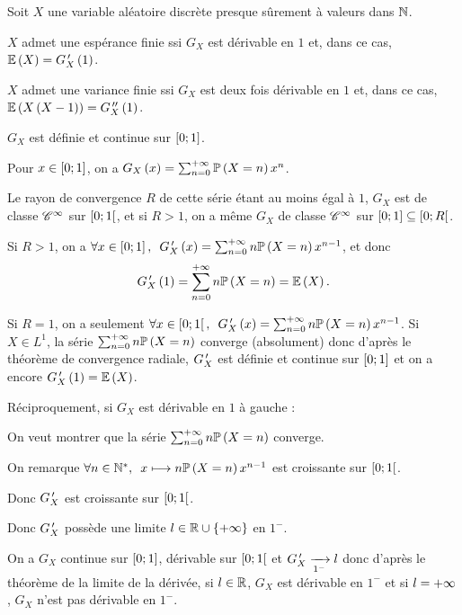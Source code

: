 \begin{theo}
Soit \(X\) une variable aléatoire discrète presque sûrement à valeurs dans \(\mathbb{N}\).

\(X\) admet une espérance finie ssi \(G_X\) est dérivable en \(1\) et, dans ce cas, \(\operatorname{\mathbb{E}}\left(X\right)=G_X^{\,\prime}\left(1\right)\).

\(X\) admet une variance finie ssi \(G_X\) est deux fois dérivable en \(1\) et, dans ce cas, \(\operatorname{\mathbb{E}}\left(X\left(X-1\right)\right)=G_X^{\,\prime\prime}\left(1\right)\).
\end{theo}

\begin{dem}
\(G_X\) est définie et continue sur \(\left[0;1\right]\).

Pour \(x\in\left[0;1\right]\), on a \(G_X\left(x\right)=\sum_{n=0}^{+\infty}\mathbb{P}\left(X=n\right)x^n\).

Le rayon de convergence \(R\) de cette série étant au moins égal à \(1\), \(G_X\) est de classe \(\mathscr{C}^{\infty}\) sur \(\left[0;1\right[\), et si \(R>1\), on a même \(G_X\) de classe \(\mathscr{C}^{\infty}\) sur \(\left[0;1\right]\subseteq\left[0;R\right[\).

Si \(R>1\), on a \(\quantifs{\forall x\in\intervii{0}{1}}G_X\prim\paren{x}=\sum_{n=0}^{\pinf}n\proba{X=n}x^{n-1}\), et donc \[G_X^{\,\prime}\left(1\right)=\sum_{n=0}^{+\infty}n\mathbb{P}\left(X=n\right)=\operatorname{\mathbb{E}}\left(X\right).\]

Si \(R=1\), on a seulement \(\quantifs{\forall x\in\intervie{0}{1}}G_X\prim\paren{x}=\sum_{n=0}^{\pinf}n\proba{X=n}x^{n-1}\). Si \(X\in L^1\), la série \(\sum_{n=0}^{+\infty}n\mathbb{P}\left(X=n\right)\) converge (absolument) donc d'après le théorème de convergence radiale, \(G_X^{\,\prime}\) est définie et continue sur \(\left[0;1\right]\) et on a encore \(G_X^{\,\prime}\left(1\right)=\operatorname{\mathbb{E}}\left(X\right)\).

Réciproquement, si \(G_X\) est dérivable en \(1\) à gauche :

On veut montrer que la série \(\sum_{n=0}^{+\infty}n\mathbb{P}\left(X=n\right)\) converge.

On remarque \(\quantifs{\forall n\in\Ns}x\mapsto n\proba{X=n}x^{n-1}\) est croissante sur \(\left[0;1\right[\).

Donc \(G_X^{\,\prime}\) est croissante sur \(\left[0;1\right[\).

Donc \(G_X^{\,\prime}\) possède une limite \(l\in\mathbb{R}\cup\left\lbrace+\infty\right\rbrace\) en \(1^-\).

On a \(G_X\) continue sur \(\left[0;1\right]\), dérivable sur \(\left[0;1\right[\) et \(G_X^{\,\prime}\xrightarrow[1^-]{}l\) donc d'après le théorème de la limite de la dérivée, si \(l\in\mathbb{R}\), \(G_X\) est dérivable en \(1^-\) et si \(l=+\infty\), \(G_X\) n'est pas dérivable en \(1^-\).


\end{dem}
